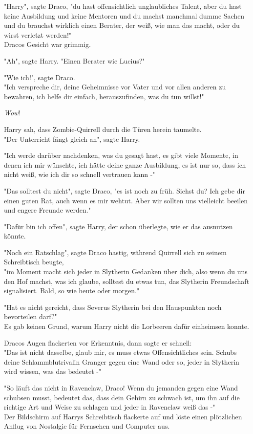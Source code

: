 {"Harry", sagte Draco, "du hast offensichtlich unglaubliches Talent, aber du hast keine Ausbildung und keine Mentoren und du machst manchmal dumme Sachen und du brauchst wirklich einen Berater, der weiß, wie man das macht, oder du wirst verletzt werden!"\\ Dracos Gesicht war grimmig.

"Ah", sagte Harry. "Einen Berater wie Lucius?"

"Wie ich!", sagte Draco.\\ "Ich verspreche dir, deine Geheimnisse vor Vater und vor allen anderen zu bewahren, ich helfe dir einfach, herauszufinden, was du tun willst!"

\emph{Wow}!

Harry sah, dass Zombie-Quirrell durch die Türen herein taumelte.\\ "Der Unterricht fängt gleich an", sagte Harry.

"Ich werde darüber nachdenken, was du gesagt hast, es gibt viele Momente, in denen ich mir wünschte, ich hätte deine ganze Ausbildung, es ist nur so, dass ich nicht weiß, wie ich dir so schnell vertrauen kann -"

"Das solltest du nicht", sagte Draco, "es ist noch zu früh. Siehst du? Ich gebe dir einen guten Rat, auch wenn es mir wehtut. Aber wir sollten uns vielleicht beeilen und engere Freunde werden."

"Dafür bin ich offen", sagte Harry, der schon überlegte, wie er das ausnutzen könnte.

"Noch ein Ratschlag", sagte Draco hastig, während Quirrell sich zu seinem Schreibtisch beugte,\\ "im Moment macht sich jeder in Slytherin Gedanken über dich, also wenn du uns den Hof machst, was ich glaube, solltest du etwas tun, das Slytherin Freundschaft signalisiert. Bald, so wie heute oder morgen."

"Hat es nicht gereicht, dass Severus Slytherin bei den Hauspunkten noch bevorteilen darf?"\\ Es gab keinen Grund, warum Harry nicht die Lorbeeren dafür einheimsen konnte.

Dracos Augen flackerten vor Erkenntnis, dann sagte er schnell:\\ "Das ist nicht dasselbe, glaub mir, es muss etwas Offensichtliches sein. Schubs deine Schlammblutrivalin Granger gegen eine Wand oder so, jeder in Slytherin wird wissen, was das bedeutet -"

"So läuft das nicht in Ravenclaw, Draco! Wenn du jemanden gegen eine Wand schubsen musst, bedeutet das, dass dein Gehirn zu schwach ist, um ihn auf die richtige Art und Weise zu schlagen und jeder in Ravenclaw weiß das -"\\ Der Bildschirm auf Harrys Schreibtisch flackerte auf und löste einen plötzlichen Anflug von Nostalgie für Fernsehen und Computer aus.

}
